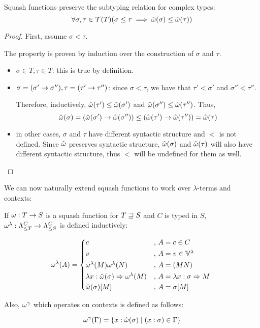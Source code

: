 \documentclass[main.tex]{subfiles}
\begin{document}
\begin{property}
    \label{prop:squash:preserve}
    Squash functions preserve the subtyping relation for complex types:
    \[ \forall \sigma, \tau \in \tclos{T} (\sigma \less \tau \implies
        \tsquash(\sigma) \less \tsquash(\tau)) \]
\end{property}
\begin{proof}
    First, assume $\sigma \less \tau$.

    The property is proven by induction over the construction of $\sigma$
    and $\tau$.

    \begin{itemize}
        \item $\sigma \in T, \tau \in T$: this is true by definition.
        \item $\sigma = (\sigma' \tot \sigma''), \tau = (\tau' \tot \tau'')$:
            since $\sigma \less \tau$, we have that $\tau' \less \sigma'$
            and $\sigma'' \less \tau''$.

            Therefore, inductively, $\tsquash(\tau') \less \tsquash(\sigma')$
            and $\tsquash(\sigma'') \less \tsquash(\tau'')$. Thus,
            \[
                \tsquash(\sigma) = (\tsquash(\sigma') \tot \tsquash(\sigma''))
                \less
                (\tsquash(\tau') \tot \tsquash(\tau'')) = \tsquash(\tau)
            \]
        \item in other cases, $\sigma$ and $\tau$ have different syntactic
            structure and $\less$ is not defined. Since $\tsquash$ preserves
            syntactic structure, $\tsquash(\sigma)$ and $\tsquash(\tau)$
            will also have different syntactic structure, thus $\less$ will
            be undefined for them as well.
    \end{itemize}
\end{proof}

We can now naturally extend squash functions to work over $\lambda$-terms
and contexts:
\begin{defn}
    If $\squash: T \rightarrow S$ is a squash function for $T \tless S$ and
    $C$ is typed in $S$,
    $\lsquash: \fancylambda{T}{C} \rightarrow \fancylambda{S}{C}$
    is defined inductively:

    \[
        \lsquash(A) =
        \begin{cases*}
            c &, $A = c \in C$ \\
            v &, $A = v \in \lvars$ \\
            \lsquash(M) \lsquash(N) &, $A = (MN)$ \\
            \lambda x : \tsquash(\sigma) \abstr \lsquash(M)
                &, $A = \lambda x : \sigma \abstr M$ \\
                \tsquash(\sigma)[M] &, $A = \sigma[M]$ \\
        \end{cases*}
    \]

    Also,
    $\consquash$ which operates on contexts
    is defined as follows:

    \[
        \consquash(\Gamma)
            = \{ x : \tsquash(\sigma) \mid (x : \sigma) \in \Gamma \}
    \]
\end{defn}
\end{document}
